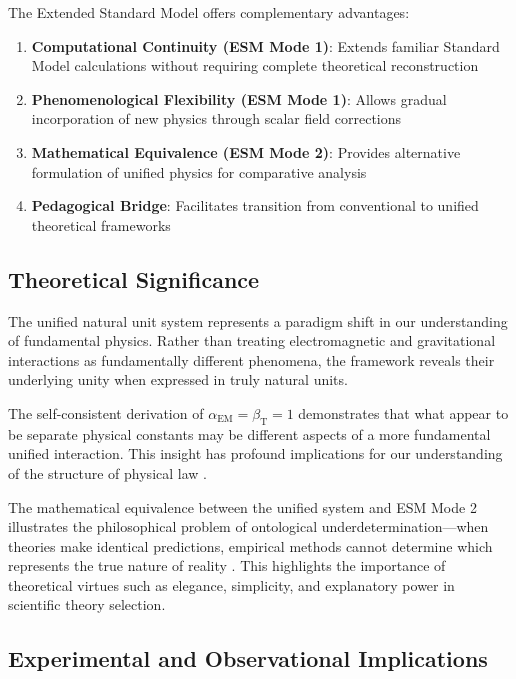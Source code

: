 \documentclass[12pt,a4paper]{article}
\newcommand{\alphaEM}{\alpha_{\text{EM}}}
\newcommand{\betaT}{\beta_{\text{T}}}
\begin{document}
	The Extended Standard Model offers complementary advantages:
	
	\begin{enumerate}
		\item \textbf{Computational Continuity (ESM Mode 1)}: Extends familiar Standard Model calculations without requiring complete theoretical reconstruction
		
		\item \textbf{Phenomenological Flexibility (ESM Mode 1)}: Allows gradual incorporation of new physics through scalar field corrections
		
		\item \textbf{Mathematical Equivalence (ESM Mode 2)}: Provides alternative formulation of unified physics for comparative analysis
		
		\item \textbf{Pedagogical Bridge}: Facilitates transition from conventional to unified theoretical frameworks
	\end{enumerate}
	
	\subsection{Theoretical Significance}
	\label{subsec:theoretical_significance}
	
	The unified natural unit system represents a paradigm shift in our understanding of fundamental physics. Rather than treating electromagnetic and gravitational interactions as fundamentally different phenomena, the framework reveals their underlying unity when expressed in truly natural units.
	
	The self-consistent derivation of $\alphaEM = \betaT = 1$ demonstrates that what appear to be separate physical constants may be different aspects of a more fundamental unified interaction. This insight has profound implications for our understanding of the structure of physical law \cite{pascher_unified_2025}.
	
	The mathematical equivalence between the unified system and ESM Mode 2 illustrates the philosophical problem of ontological underdetermination—when theories make identical predictions, empirical methods cannot determine which represents the true nature of reality \cite{Duhem1906}. This highlights the importance of theoretical virtues such as elegance, simplicity, and explanatory power in scientific theory selection.
	
	\subsection{Experimental and Observational Implications}
	\label{subsec:experimental_implications}
	
\end{document}
